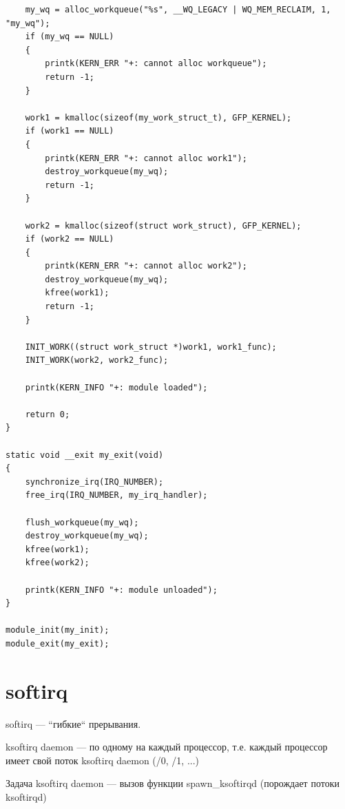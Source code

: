 \begin{lstlisting}
    my_wq = alloc_workqueue("%s", __WQ_LEGACY | WQ_MEM_RECLAIM, 1, "my_wq");
    if (my_wq == NULL)
    {
        printk(KERN_ERR "+: cannot alloc workqueue");
        return -1;
    }

    work1 = kmalloc(sizeof(my_work_struct_t), GFP_KERNEL);
    if (work1 == NULL)
    {
        printk(KERN_ERR "+: cannot alloc work1");
        destroy_workqueue(my_wq);
        return -1;
    }

    work2 = kmalloc(sizeof(struct work_struct), GFP_KERNEL);
    if (work2 == NULL)
    {
        printk(KERN_ERR "+: cannot alloc work2");
        destroy_workqueue(my_wq);
        kfree(work1);
        return -1;
    }

    INIT_WORK((struct work_struct *)work1, work1_func);
    INIT_WORK(work2, work2_func);
    
    printk(KERN_INFO "+: module loaded");

    return 0;
}

static void __exit my_exit(void)
{
    synchronize_irq(IRQ_NUMBER);
    free_irq(IRQ_NUMBER, my_irq_handler);

    flush_workqueue(my_wq);
    destroy_workqueue(my_wq);
    kfree(work1);
    kfree(work2);
    
    printk(KERN_INFO "+: module unloaded");
}

module_init(my_init);
module_exit(my_exit);

\end{lstlisting}

\section{softirq}

softirq --- ``гибкие`` прерывания.

ksoftirq daemon --- по одному на каждый процессор, т.е. каждый процессор имеет свой поток ksoftirq daemon (/0, /1, ...)

Задача ksoftirq daemon --- вызов функции spawn\_ksoftirqd (порождает потоки ksoftirqd)


